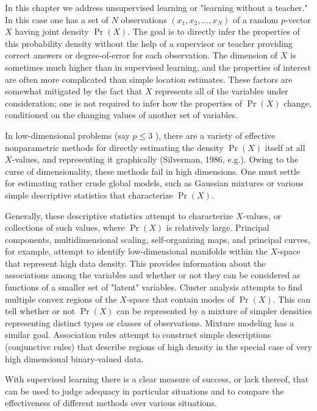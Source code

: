 \documentclass[10pt]{article}
\begin{document}
In this chapter we address unsupervised learning or "learning without a teacher." In this case one has a set of $N$ observations $\left(x_{1}, x_{2}, \ldots, x_{N}\right)$ of a random $p$-vector $X$ having joint density $\operatorname{Pr}(X)$. The goal is to directly infer the properties of this probability density without the help of a supervisor or teacher providing correct answers or degree-of-error for each observation. The dimension of $X$ is sometimes much higher than in supervised learning, and the properties of interest are often more complicated than simple location estimates. These factors are somewhat mitigated by the fact that $X$ represents all of the variables under consideration; one is not required to infer how the properties of $\operatorname{Pr}(X)$ change, conditioned on the changing values of another set of variables.

In low-dimensional problems (say $p \leq 3$ ), there are a variety of effective nonparametric methods for directly estimating the density $\operatorname{Pr}(X)$ itself at all $X$-values, and representing it graphically (Silverman, 1986, e.g.). Owing to the curse of dimensionality, these methods fail in high dimensions. One must settle for estimating rather crude global models, such as Gaussian mixtures or various simple descriptive statistics that characterize $\operatorname{Pr}(X)$.

Generally, these descriptive statistics attempt to characterize $X$-values, or collections of such values, where $\operatorname{Pr}(X)$ is relatively large. Principal components, multidimensional scaling, self-organizing maps, and principal curves, for example, attempt to identify low-dimensional manifolds within the $X$-space that represent high data density. This provides information about the associations among the variables and whether or not they can be considered as functions of a smaller set of "latent" variables. Cluster analysis attempts to find multiple convex regions of the $X$-space that contain modes of $\operatorname{Pr}(X)$. This can tell whether or not $\operatorname{Pr}(X)$ can be represented by a mixture of simpler densities representing distinct types or classes of observations. Mixture modeling has a similar goal. Association rules attempt to construct simple descriptions (conjunctive rules) that describe regions of high density in the special case of very high dimensional binary-valued data.

With supervised learning there is a clear measure of success, or lack thereof, that can be used to judge adequacy in particular situations and to compare the effectiveness of different methods over various situations.
\end{document}
